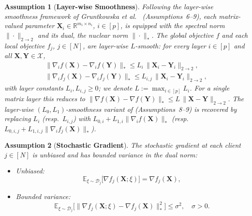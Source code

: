 \documentclass[letterpaper]{article} %
\newtheorem{assumption}{Assumption}
\begin{document}

\begin{assumption}[\textbf{Layer-wise Smoothness}]\label{as:2}
Following the layer-wise smoothness framework of Gruntkowska et al.~\cite{gruntkowska2025error} (Assumptions~6--9), each matrix-valued parameter $\mathbf{X}_i \in \mathbb{R}^{m_i \times n_i}$, $i \in [p]$, is equipped with the spectral norm $\|\cdot\|_{2\to 2}$ and its dual, the nuclear norm $\|\cdot\|_{*}$. The global objective $f$ and each local objective $f_j$, $j \in [N]$, are layer-wise $L$-smooth: for every layer $i \in [p]$ and all $\mathbf{X}, \mathbf{Y} \in \mathcal{X}$,
\begin{equation}
\begin{gathered}
\|\nabla_i f(\mathbf{X}) - \nabla_i f(\mathbf{Y})\|_{*} \le L_i\,\|\mathbf{X}_i - \mathbf{Y}_i\|_{2\to 2}, \\
\|\nabla_i f_j(\mathbf{X}) - \nabla_i f_j(\mathbf{Y})\|_{*} \le L_{i,j}\,\|\mathbf{X}_i - \mathbf{Y}_i\|_{2\to 2},
\end{gathered}
\end{equation}
with layer constants $L_i, L_{i,j} \ge 0$; we denote $L := \max_{i \in [p]} L_i$. For a single matrix layer this reduces to $\|\nabla f(\mathbf{X}) - \nabla f(\mathbf{Y})\|_{*} \le L\,\|\mathbf{X} - \mathbf{Y}\|_{2\to 2}$. The layer-wise $(L_0, L_1)$-smoothness variant of \cite{gruntkowska2025error} (Assumptions~8--9) is recovered by replacing $L_i$ (resp.\ $L_{i,j}$) with $L_{0,i} + L_{1,i}\|\nabla_i f(\mathbf{X})\|_{*}$ (resp.\ $L_{0,i,j} + L_{1,i,j}\|\nabla_i f_j(\mathbf{X})\|_{*}$).
\end{assumption}

\begin{assumption}[\textbf{Stochastic Gradient}]\label{as:3}
The stochastic gradient at each client $j \in [N]$ is unbiased and has bounded variance in the dual norm:
\begin{itemize}
    \item Unbiased: \begin{equation}
    \mathbb{E}_{\xi \sim \mathcal{D}_j}\bigl[\nabla f_j(\mathbf{X};\xi)\bigr] = \nabla f_j(\mathbf{X}),
    \end{equation}
    \item Bounded variance: \begin{equation}
    \mathbb{E}_{\xi \sim \mathcal{D}_j}\bigl[\|\nabla f_j(\mathbf{X};\xi) - \nabla f_j(\mathbf{X})\|_*^2\bigr] \le \sigma^2, \quad \sigma > 0.
    \end{equation}
\end{itemize}
\end{assumption}
\end{document}
